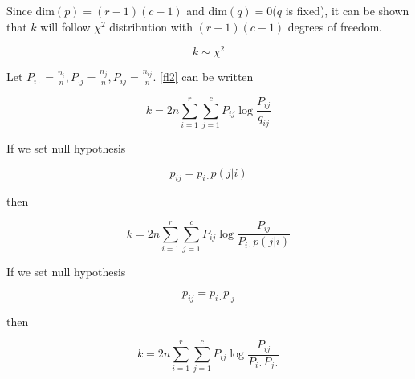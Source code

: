 Since dim\((p) = (r - 1)(c - 1)\) and dim\((q) = 0\)(\(q\) is fixed),
it can be shown that \(k\) will follow \(\chi^{2}\) distribution with
\((r-1)(c-1)\) degrees of freedom\cite{label5050}.

\[
k \sim \chi^{2}
\]

Let \(P_{i\cdot} = \frac{n_{i}}{n}, 
P_{\cdot j} = \frac{n_{j}}{n}, 
P_{ij} = \frac{n_{ij}}{n}\). \ref{fl2} can be written

\begin{equation}
k = 2n\sum_{i=1}^{r}\sum_{j=1}^{c}P_{ij}\log\frac{P_{ij}}{q_{ij}}
\end{equation}

If we set null hypothesis 

\[
p_{ij} = p_{i\cdot}p(j|i)
\]

then

\begin{equation}
k = 2n\sum_{i=1}^{r}\sum_{j=1}^{c}P_{ij}\log\frac{P_{ij}}{P_{i\cdot}p(j|i)}
\end{equation}

If we set null hypothesis

\[
p_{ij} = p_{i\cdot}p_{\cdot j}
\]

then

\begin{equation}
k = 2n\sum_{i=1}^{r}\sum_{j=1}^{c}P_{ij}\log\frac{P_{ij}}{P_{i\cdot}P_{j\cdot}}
\end{equation}

